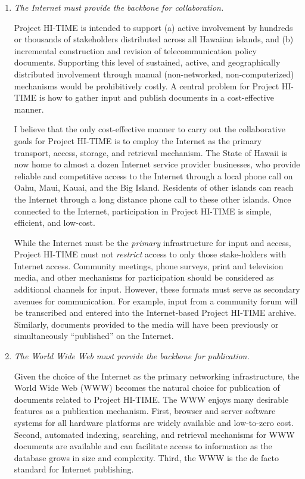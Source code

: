 \begin{enumerate}
\item {\em The Internet must provide the backbone for collaboration.}

  Project HI-TIME is intended to support (a) active involvement by
  hundreds or thousands of stakeholders distributed across all Hawaiian
  islands, and (b) incremental construction and revision of
  telecommunication policy documents.  Supporting this level of
  sustained, active, and geographically distributed involvement through
  manual (non-networked, non-computerized) mechanisms would be
  prohibitively costly.  A central problem for Project HI-TIME is how to
  gather input and publish documents in a cost-effective manner.

  I believe that the only cost-effective manner to carry out the
  collaborative goals for Project HI-TIME is to employ the Internet as
  the primary transport, access, storage, and retrieval mechanism.
  The State of Hawaii is now home to almost a dozen Internet service provider
  businesses,
  who provide reliable and competitive access to the
  Internet through a local phone call on Oahu, Maui,
  Kauai, and the Big Island. Residents of other islands can reach the
  Internet through a long distance phone call to these other islands.
  Once connected to the Internet, participation in
  Project HI-TIME is simple, efficient, and low-cost.

  While the Internet must be the {\em primary} infrastructure for input
  and access, Project HI-TIME must not {\em restrict} access to only
  those stake-holders with Internet access.  Community meetings, phone
  surveys, print and television media, and other mechanisms for
  participation should be considered as additional channels for
  input.  However, these formats must serve as secondary avenues for
  communication. For example, input from a community forum will be transcribed and
  entered into the Internet-based Project HI-TIME  archive.
  Similarly, documents provided to the media will have been
  previously or simultaneously ``published'' on the Internet.

\item {\em The World Wide Web must provide the backbone for publication.}

  Given the choice of the Internet as the primary networking
  infrastructure, the World Wide Web (WWW) becomes the natural choice for
  publication of documents related to Project HI-TIME. The WWW enjoys
  many desirable features as a publication mechanism.  First, browser and
  server software systems for all hardware platforms are widely available
  and low-to-zero cost. Second, automated indexing, searching, and
  retrieval mechanisms for WWW documents are available and can facilitate
  access to information as the database grows in size and complexity.
  Third, the WWW is the de facto standard for Internet publishing.


\end{enumerate}
